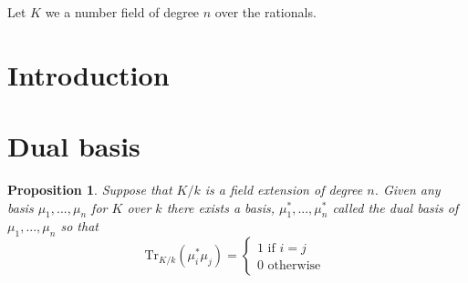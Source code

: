 \documentclass{article}
\newtheorem{proposition}{Proposition}[section]
\newcommand{\tr}{\text{Tr}}
\begin{document}

\tableofcontents



Let $K$ we a number field of degree $n$ over the rationals.






\section{Introduction}


\section{Dual basis}

\begin{proposition}\label{prop: Existence of dual basis}
    Suppose that $K/k$ is a field extension of degree $n$. Given any basis $\mu_1, ..., \mu_n$ for $K$ over $k$ there exists a basis, $\mu_1^*, ..., \mu_n^*$ called the dual basis of $\mu_1, ..., \mu_n$ so that 
    $$\tr_{K/k}(\mu_i^* \mu_j) = \begin{cases*}
        1 \text{ if } i = j \\
        0 \text{ otherwise }
    \end{cases*}$$
\end{proposition}
\end{document}
